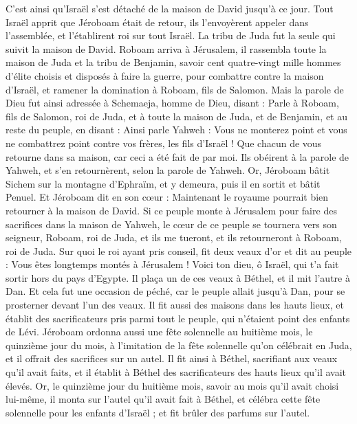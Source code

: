 \begin{multicols}{2}
C’est ainsi qu’Israël s’est détaché de la maison de David jusqu'à ce jour.
Tout Israël apprit que Jéroboam était de retour, ils l'envoyèrent appeler dans l'assemblée, et l'établirent roi sur tout Israël. La tribu de Juda fut la seule qui suivit la maison de David.
Roboam arriva à Jérusalem, il rassembla toute la maison de Juda et la tribu de Benjamin, savoir cent quatre-vingt mille hommes d’élite choisis et disposés à faire la guerre, pour combattre contre la maison d'Israël, et ramener la domination à Roboam, fils de Salomon.
Mais la parole de Dieu fut ainsi adressée à Schemaeja, homme de Dieu, disant :
Parle à Roboam, fils de Salomon, roi de Juda, et à toute la maison de Juda, et de Benjamin, et au reste du peuple, en disant :
Ainsi parle Yahweh : Vous ne monterez point et vous ne combattrez point contre vos frères, les fils d'Israël ! Que chacun de vous retourne dans sa maison, car ceci a été fait de par moi. Ils obéirent à la parole de Yahweh, et s'en retournèrent, selon la parole de Yahweh.
Or, Jéroboam bâtit Sichem sur la montagne d'Ephraïm, et y demeura, puis il en sortit et bâtit Penuel.
Et Jéroboam dit en son cœur : Maintenant le royaume pourrait bien retourner à la maison de David.
Si ce peuple monte à Jérusalem pour faire des sacrifices dans la maison de Yahweh, le cœur de ce peuple se tournera vers son seigneur, Roboam, roi de Juda, et ils me tueront, et ils retourneront à Roboam, roi de Juda.
Sur quoi le roi ayant pris conseil, fit deux veaux d'or et dit au peuple : Vous êtes longtemps montés à Jérusalem ! Voici ton dieu, ô Israël, qui t'a fait sortir hors du pays d'Egypte.
Il plaça un de ces veaux à Béthel, et il mit l'autre à Dan.
Et cela fut une occasion de péché, car le peuple allait jusqu'à Dan, pour se prosterner devant l'un des veaux.
Il fit aussi des maisons dans les hauts lieux, et établit des sacrificateurs pris parmi tout le peuple, qui n'étaient point des enfants de Lévi.
Jéroboam ordonna aussi une fête solennelle au huitième mois, le quinzième jour du mois, à l'imitation de la fête solennelle qu'on célébrait en Juda, et il offrait des sacrifices sur un autel. Il fit ainsi à Béthel, sacrifiant aux veaux qu'il avait faits, et il établit à Béthel des sacrificateurs des hauts lieux qu'il avait élevés.
Or, le quinzième jour du huitième mois, savoir au mois qu'il avait choisi lui-même, il monta sur l'autel qu'il avait fait à Béthel, et célébra cette fête solennelle pour les enfants d'Israël ; et fit brûler des parfums sur l'autel.

\end{multicols}
